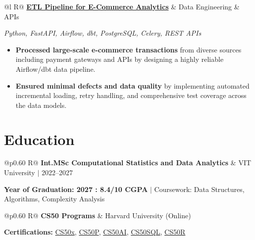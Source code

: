 \documentclass[a4paper,10pt]{article}
\newcommand{\ulink}[2]{\href{#1}{#2}}
\newcommand{\subheading}[1]{{\color[HTML]{0A0A0A}\fontsize{12}{14}\selectfont\bfseries #1}}
\newcommand{\techstack}[1]{{\color[HTML]{5C5C5C}\fontsize{10.5}{12.5}\selectfont\itshape #1}}
\newcommand{\meta}[1]{{\color[HTML]{5C5C5C}\fontsize{10.5}{12.5}\selectfont #1}}
\begin{document}
\begin{tabularx}{\linewidth}{@{}l R@{}}
\subheading{\ulink{https://github.com/su-jin1425/ETL-Pipeline-for-E-Commerce-Analytics}{ETL Pipeline for E-Commerce Analytics}} & \meta{Data Engineering \& APIs}
\end{tabularx}
\techstack{Python, FastAPI, Airflow, dbt, PostgreSQL, Celery, REST APIs}
\begin{itemize}[nosep, leftmargin=1.5em, itemsep=2pt, topsep=2pt]
  \item {\color[HTML]{0A0A0A}\fontsize{11}{14}\selectfont \textbf{Processed large-scale e-commerce transactions} from diverse sources including payment gateways and APIs by designing a highly reliable Airflow/dbt data pipeline.}
  \item {\color[HTML]{0A0A0A}\fontsize{11}{14}\selectfont \textbf{Ensured minimal defects and data quality} by implementing automated incremental loading, retry handling, and comprehensive test coverage across the data models.}
\end{itemize}

\section{Education}
\vspace{2pt}

\begin{tabularx}{\linewidth}{@{}p{0.60\linewidth} R@{}}
\subheading{Int.MSc Computational Statistics and Data Analytics} & \meta{VIT University $|$ 2022--2027}
\end{tabularx}
{\color[HTML]{3A3A3A}\fontsize{11}{14}\selectfont \textbf{Year of Graduation: 2027 : 8.4/10 CGPA} $|$ Coursework: Data Structures, Algorithms, Complexity Analysis}

\begin{tabularx}{\linewidth}{@{}p{0.60\linewidth} R@{}}
\subheading{CS50 Programs} & \meta{Harvard University (Online)}
\end{tabularx}
{\color[HTML]{3A3A3A}\fontsize{11}{14}\selectfont \textbf{Certifications:} \ulink{https://cs50.harvard.edu/certificates/b14b78df-e05c-413e-a607-1dd27303053a}{CS50x}, \ulink{https://cs50.harvard.edu/certificates/32477052-9db4-49c4-a5a4-d7e58429ca2c}{CS50P}, \ulink{https://cs50.harvard.edu/certificates/9cdb4d4a-1250-4f8e-9fd7-191864e0f919}{CS50AI}, \ulink{https://cs50.harvard.edu/certificates/bc486f24-f085-4e61-8536-80940b97a1b9}{CS50SQL}, \ulink{https://cs50.harvard.edu/certificates/666838e6-a053-4d82-b179-a60fe745fd84}{CS50R}}
\end{document}
